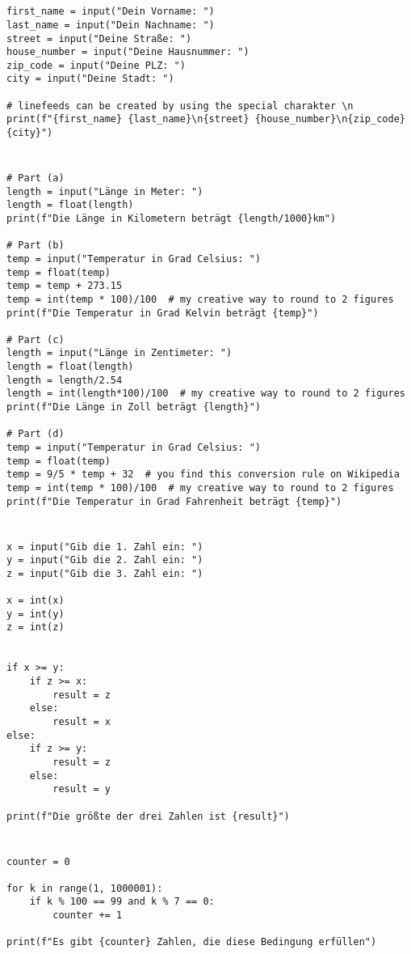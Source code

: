 \documentclass[a4paper]{article}
\begin{document}




\section{}
\begin{verbatim}
first_name = input("Dein Vorname: ")
last_name = input("Dein Nachname: ")
street = input("Deine Straße: ")
house_number = input("Deine Hausnummer: ")
zip_code = input("Deine PLZ: ")
city = input("Deine Stadt: ")

# linefeeds can be created by using the special charakter \n
print(f"{first_name} {last_name}\n{street} {house_number}\n{zip_code} {city}")
\end{verbatim}

\section{}
\begin{verbatim}
# Part (a)
length = input("Länge in Meter: ")
length = float(length)
print(f"Die Länge in Kilometern beträgt {length/1000}km")

# Part (b)
temp = input("Temperatur in Grad Celsius: ")
temp = float(temp)
temp = temp + 273.15
temp = int(temp * 100)/100  # my creative way to round to 2 figures
print(f"Die Temperatur in Grad Kelvin beträgt {temp}")

# Part (c)
length = input("Länge in Zentimeter: ")
length = float(length)
length = length/2.54
length = int(length*100)/100  # my creative way to round to 2 figures
print(f"Die Länge in Zoll beträgt {length}")

# Part (d)
temp = input("Temperatur in Grad Celsius: ")
temp = float(temp)
temp = 9/5 * temp + 32  # you find this conversion rule on Wikipedia
temp = int(temp * 100)/100  # my creative way to round to 2 figures
print(f"Die Temperatur in Grad Fahrenheit beträgt {temp}")
\end{verbatim}

\newpage
\section{} 
\begin{verbatim}
x = input("Gib die 1. Zahl ein: ")
y = input("Gib die 2. Zahl ein: ")
z = input("Gib die 3. Zahl ein: ")

x = int(x)
y = int(y)
z = int(z)


if x >= y:
    if z >= x:
        result = z
    else:
        result = x
else:
    if z >= y:
        result = z
    else:
        result = y

print(f"Die größte der drei Zahlen ist {result}")
\end{verbatim}

\section{}
\begin{verbatim}
counter = 0

for k in range(1, 1000001):
    if k % 100 == 99 and k % 7 == 0:
        counter += 1

print(f"Es gibt {counter} Zahlen, die diese Bedingung erfüllen")
\end{verbatim}
\end{document}
